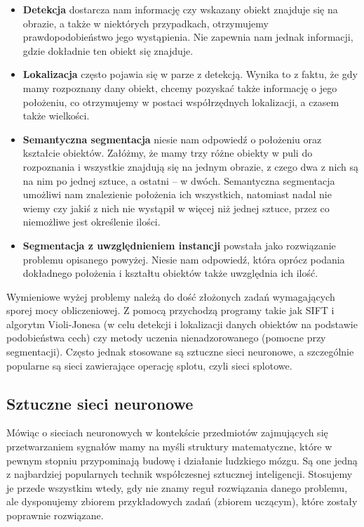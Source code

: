 \documentclass{article}
\begin{document}
\begin{itemize}
\item \textbf{Detekcja} dostarcza nam informację czy wskazany obiekt znajduje się na obrazie,
a także w niektórych przypadkach, otrzymujemy prawdopodobieństwo jego wystąpienia. Nie zapewnia nam jednak informacji, gdzie dokładnie ten obiekt się znajduje.

\item \textbf{Lokalizacja} często pojawia się w parze z detekcją. Wynika to z faktu, że gdy mamy rozpoznany dany obiekt, chcemy pozyskać także informację o jego położeniu, co otrzymujemy w postaci współrzędnych lokalizacji, a czasem także wielkości.

\item \textbf{Semantyczna segmentacja} niesie nam odpowiedź o położeniu oraz kształcie obiektów. Załóżmy, że mamy trzy różne obiekty w puli do rozpoznania i wszystkie znajdują się na jednym obrazie, z czego dwa z nich są na nim po jednej sztuce, a ostatni – w dwóch. Semantyczna segmentacja umożliwi nam znalezienie położenia ich wszystkich, natomiast nadal nie wiemy czy jakiś z nich nie wystąpił w więcej niż jednej sztuce, przez co niemożliwe jest określenie ilości.

\item \textbf{Segmentacja z uwzględnieniem instancji} powstała jako rozwiązanie problemu opisanego powyżej. Niesie nam odpowiedź, która oprócz podania dokładnego położenia i kształtu obiektów także uwzględnia ich ilość.
\end{itemize} 

Wymieniowe wyżej problemy należą do dość złożonych zadań wymagających sporej mocy obliczeniowej. Z pomocą przychodzą programy takie jak SIFT i algorytm Violi-Jonesa (w celu detekcji i lokalizacji danych obiektów na podstawie podobieństwa cech) czy metody uczenia nienadzorowanego (pomocne przy segmentacji). Często jednak stosowane są sztuczne sieci neuronowe, a szczególnie popularne są sieci zawierające operację splotu, czyli sieci splotowe.

\subsection{\LARGE{Sztuczne sieci neuronowe}}
Mówiąc o sieciach neuronowych w kontekście przedmiotów zajmujących się przetwarzaniem sygnałów mamy na myśli struktury matematyczne, które w pewnym stopniu przypominają budowę i działanie ludzkiego mózgu. Są one jedną z najbardziej popularnych technik współczesnej sztucznej inteligencji. Stosujemy je przede wszystkim wtedy, gdy nie znamy reguł rozwiązania danego problemu, ale dysponujemy zbiorem przykładowych zadań (zbiorem uczącym), które zostały poprawnie rozwiązane. 
\end{document}
